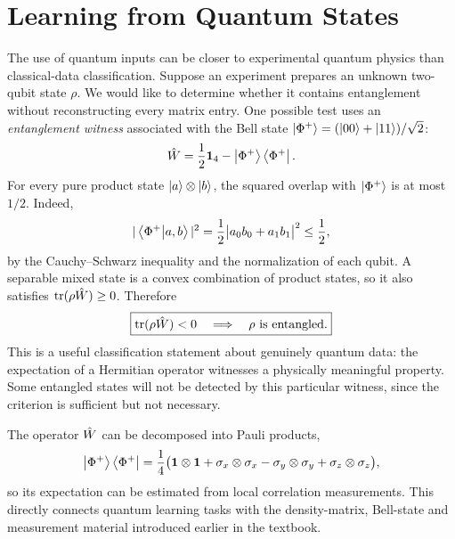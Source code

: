 \section{Learning from Quantum States}
The use of quantum inputs can be closer to experimental quantum physics than classical-data classification. Suppose an experiment prepares an unknown two-qubit state $\rho$. We would like to determine whether it contains entanglement without reconstructing every matrix entry. One possible test uses an \emph{entanglement witness} associated with the Bell state $\left|\Phi^+\right\rangle=(\left|00\right\rangle+\left|11\right\rangle)/\sqrt2$:
\begin{equation}
 \hat{W}=\frac12\mathbf1_4-\left|\Phi^+\right\rangle\left\langle\Phi^+\right|.
\end{equation}
For every pure product state $\left|a\right\rangle\otimes\left|b\right\rangle$, the squared overlap with $\left|\Phi^+\right\rangle$ is at most $1/2$. Indeed,
\begin{equation}
|\left\langle\Phi^+\middle|a,b\right\rangle|^2
=\frac12\bigl|a_0b_0+a_1b_1\bigr|^2\le\frac12,
\end{equation}
by the Cauchy--Schwarz inequality and the normalization of each qubit. A separable mixed state is a convex combination of product states, so it also satisfies $\operatorname{tr}(\rho\hat{W})\ge0$. Therefore
\begin{equation}
 \boxed{\operatorname{tr}(\rho\hat{W})<0
 \quad\Longrightarrow\quad\rho\text{ is entangled}.}
\end{equation}
This is a useful classification statement about genuinely quantum data: the expectation of a Hermitian operator witnesses a physically meaningful property. Some entangled states will not be detected by this particular witness, since the criterion is sufficient but not necessary.

The operator $\hat{W}$ can be decomposed into Pauli products,
\begin{equation}
\left|\Phi^+\right\rangle\left\langle\Phi^+\right|
=\frac14\bigl(\mathbf1\otimes\mathbf1+
\sigma_x\otimes\sigma_x-\sigma_y\otimes\sigma_y+
\sigma_z\otimes\sigma_z\bigr),
\end{equation}
so its expectation can be estimated from local correlation measurements. This directly connects quantum learning tasks with the density-matrix, Bell-state and measurement material introduced earlier in the textbook.

\clearpage
